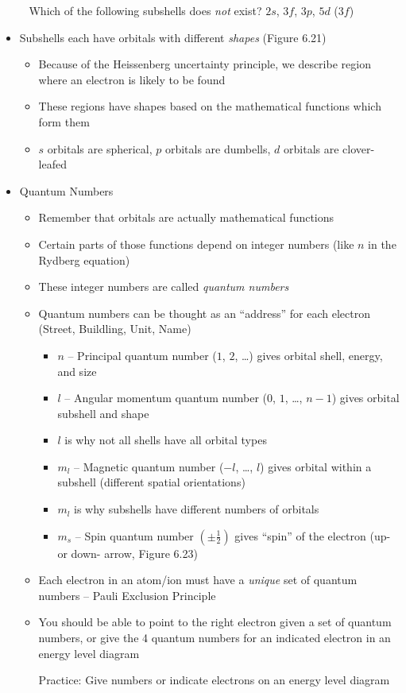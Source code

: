 \documentclass[12pt, openany, letterpaper]{memoir}
\begin{document}
\begin{itemize}
	      ~\hphantom{Practice:} Which of the following subshells does \emph{not} exist? $2s$, $3f$, $3p$, $5d$ ($3f$)
	\item Subshells each have orbitals with different \emph{shapes} (Figure 6.21)
	      \begin{itemize}
		      \item Because of the Heissenberg uncertainty principle, we describe region where an electron is likely to be found
		      \item These regions have shapes based on the mathematical functions which form them
		      \item $s$ orbitals are spherical, $p$ orbitals are dumbells, $d$ orbitals are clover-leafed
	      \end{itemize}
  \item Quantum Numbers
    \begin{itemize}
      \item Remember that orbitals are actually mathematical functions
      \item Certain parts of those functions depend on integer numbers (like $n$ in the Rydberg equation)
      \item These integer numbers are called \emph{quantum numbers}
      \item Quantum numbers can be thought as an ``address'' for each electron (Street, Buildling, Unit, Name)
            \begin{itemize}
              \item $n$ -- Principal quantum number ($1$, $2$, \ldots) gives orbital shell, energy, and size
              \item $l$ -- Angular momentum quantum number ($0$, $1$, \ldots, $n-1$) gives orbital subshell and shape
              \item $l$ is why not all shells have all orbital types
              \item $m_l$ -- Magnetic quantum number ($-l$, \ldots, $l$) gives orbital within a subshell (different spatial orientations)
              \item $m_l$ is why subshells have different numbers of orbitals
              \item $m_s$ -- Spin quantum number $\left(\pm \frac{1}{2}\right)$ gives ``spin'' of the electron (up- or down- arrow, Figure 6.23)
            \end{itemize}
      \item Each electron in an atom/ion must have a \emph{unique} set of quantum numbers -- Pauli Exclusion Principle
      \item You should be able to point to the right electron given a set of quantum numbers, or give the 4 quantum numbers for an indicated electron in an energy level diagram

            Practice: Give numbers or indicate electrons on an energy level diagram
    \end{itemize}
\end{itemize}
\end{document}
